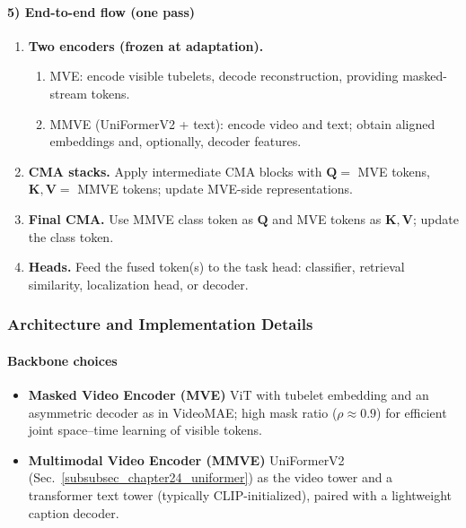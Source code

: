 \begin{enrichment}
\begin{enrichment}
        \paragraph{5) End-to-end flow (one pass)}
        \begin{enumerate}
            \item \textbf{Two encoders (frozen at adaptation).} 
            \begin{enumerate}
                \item MVE: encode visible tubelets, decode reconstruction, providing masked-stream tokens.
                \item MMVE (UniFormerV2 + text): encode video and text; obtain aligned embeddings and, optionally, decoder features.
            \end{enumerate}
            \item \textbf{CMA stacks.} Apply intermediate CMA blocks with \(\bm{Q}=\) MVE tokens, \(\bm{K},\bm{V}=\) MMVE tokens; update MVE-side representations. 
            \item \textbf{Final CMA.} Use MMVE class token as \(\bm{Q}\) and MVE tokens as \(\bm{K},\bm{V}\); update the class token.
            \item \textbf{Heads.} Feed the fused token(s) to the task head: classifier, retrieval similarity, localization head, or decoder. 
        \end{enumerate}
        
        \subsubsection{Architecture and Implementation Details}
        \label{subsubsec_chapter24_internvideo_arch_impl}
        
        \paragraph{Backbone choices}
        \begin{itemize}
            \item \textbf{Masked Video Encoder (MVE)} ViT with tubelet embedding and an asymmetric decoder as in VideoMAE; high mask ratio (\(\rho\!\approx\!0.9\)) for efficient joint space–time learning of visible tokens.
            \item \textbf{Multimodal Video Encoder (MMVE)} UniFormerV2 (Sec.~\ref{subsubsec_chapter24_uniformer}) as the video tower and a transformer text tower (typically CLIP-initialized), paired with a lightweight caption decoder.
        \end{itemize}
        

\end{enrichment}
\end{enrichment}
